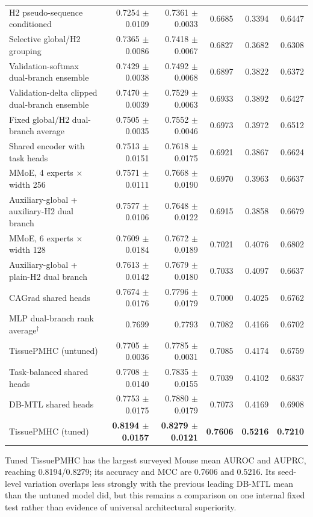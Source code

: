 \begin{table}[t]
\begin{tabularx}{\textwidth}{>{\raggedright\arraybackslash}Xrrrrr}
H2 pseudo-sequence conditioned & 0.7254 $\pm$ 0.0109 & 0.7361 $\pm$ 0.0033 & 0.6685 & 0.3394 & 0.6447 \\
Selective global/H2 grouping & 0.7365 $\pm$ 0.0086 & 0.7418 $\pm$ 0.0067 & 0.6827 & 0.3682 & 0.6308 \\
Validation-softmax dual-branch ensemble & 0.7429 $\pm$ 0.0038 & 0.7492 $\pm$ 0.0068 & 0.6897 & 0.3822 & 0.6372 \\
Validation-delta clipped dual-branch ensemble & 0.7470 $\pm$ 0.0039 & 0.7529 $\pm$ 0.0063 & 0.6933 & 0.3892 & 0.6427 \\
Fixed global/H2 dual-branch average & 0.7505 $\pm$ 0.0035 & 0.7552 $\pm$ 0.0046 & 0.6973 & 0.3972 & 0.6512 \\
Shared encoder with task heads & 0.7513 $\pm$ 0.0151 & 0.7618 $\pm$ 0.0175 & 0.6921 & 0.3867 & 0.6624 \\
MMoE, 4 experts $\times$ width 256 & 0.7571 $\pm$ 0.0111 & 0.7668 $\pm$ 0.0190 & 0.6970 & 0.3963 & 0.6637 \\
Auxiliary-global + auxiliary-H2 dual branch & 0.7577 $\pm$ 0.0106 & 0.7648 $\pm$ 0.0122 & 0.6915 & 0.3858 & 0.6679 \\
MMoE, 6 experts $\times$ width 128 & 0.7609 $\pm$ 0.0184 & 0.7672 $\pm$ 0.0189 & 0.7021 & 0.4076 & 0.6802 \\
Auxiliary-global + plain-H2 dual branch & 0.7613 $\pm$ 0.0142 & 0.7679 $\pm$ 0.0180 & 0.7033 & 0.4097 & 0.6637 \\
CAGrad shared heads & 0.7674 $\pm$ 0.0176 & 0.7796 $\pm$ 0.0179 & 0.7000 & 0.4025 & 0.6762 \\
MLP dual-branch rank average$^\dagger$ & 0.7699 & 0.7793 & 0.7082 & 0.4166 & 0.6702 \\
TissuePMHC (untuned) & 0.7705 $\pm$ 0.0036 & 0.7785 $\pm$ 0.0031 & 0.7085 & 0.4174 & 0.6759 \\
Task-balanced shared heads & 0.7708 $\pm$ 0.0140 & 0.7835 $\pm$ 0.0155 & 0.7039 & 0.4102 & 0.6837 \\
DB-MTL shared heads & 0.7753 $\pm$ 0.0175 & 0.7880 $\pm$ 0.0179 & 0.7073 & 0.4169 & 0.6908 \\
TissuePMHC (tuned) & \textbf{0.8194 $\pm$ 0.0157} & \textbf{0.8279 $\pm$ 0.0121} & \textbf{0.7606} & \textbf{0.5216} & \textbf{0.7210} \\
\bottomrule
\end{tabularx}
\end{table}
\FloatBarrier

Tuned TissuePMHC has the largest surveyed Mouse mean AUROC and AUPRC, reaching 0.8194/0.8279; its accuracy and MCC are 0.7606 and 0.5216. Its seed-level variation overlaps less strongly with the previous leading DB-MTL mean than the untuned model did, but this remains a comparison on one internal fixed test rather than evidence of universal architectural superiority.

